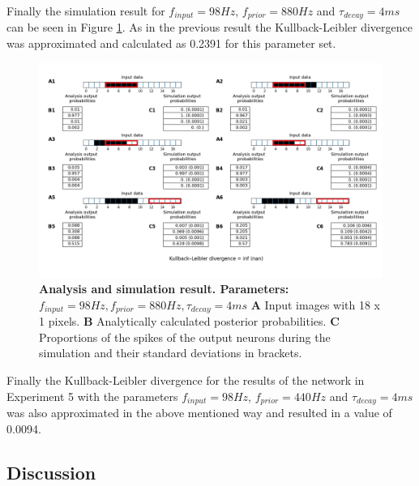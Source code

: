 Finally the simulation result for $f_{input} = 98 Hz$, $f_{prior} = 880 Hz$ and $\tau_{decay} = 4 ms$ can be seen in Figure \ref{fig:doubleSize_98_880_4}. As in the previous result the Kullback-Leibler divergence was approximated and calculated as 0.2391 for this parameter set.
\begin{figure}
  \includegraphics[width=\linewidth]{figures/1D/doubleSize/doubleSize_98_880_4.png}
  \caption{\textbf{Analysis and simulation result. Parameters: } $f_{input} = 98 Hz, f_{prior} = 880 Hz, \tau_{decay} = 4 ms$ \textbf{A} Input images with 18 x 1 pixels. \textbf{B} Analytically calculated posterior probabilities. \textbf{C} Proportions of the spikes of the output neurons during the simulation and their standard deviations in brackets.}
  \label{fig:doubleSize_98_880_4}
\end{figure}

Finally the Kullback-Leibler divergence for the results of the network in Experiment 5 with the parameters $f_{input} = 98 Hz$, $f_{prior} = 440 Hz$ and $\tau_{decay} = 4 ms$ was also approximated in the above mentioned way and resulted in a value of 0.0094.

\subsection{Discussion}

